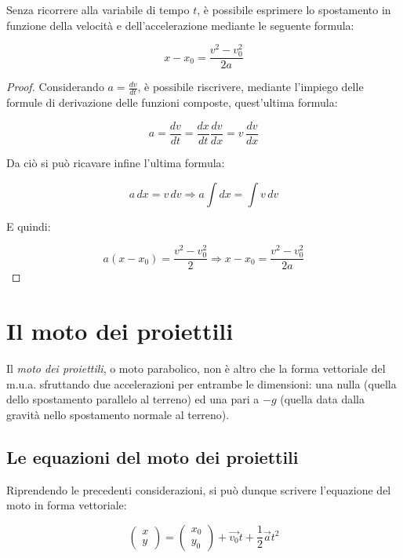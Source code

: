 Senza ricorrere alla variabile di tempo $t$, è possibile
esprimere lo spostamento in funzione della velocità e dell'accelerazione
mediante le seguente formula:

\begin{equation}
    x-x_0=\frac{v^2-v_0^2}{2a}
\end{equation}

\begin{proof}

    Considerando $a=\frac{dv}{dt}$, è possibile riscrivere, mediante l'impiego
    delle formule di derivazione delle funzioni composte, quest'ultima formula:

    \begin{equation*}
        a=\frac{dv}{dt}=\frac{dx}{dt}\frac{dv}{dx}=v\,\frac{dv}{dx}
    \end{equation*}

    Da ciò si può ricavare infine l'ultima formula:

    \begin{equation*}
        a\,dx=v\,dv \Rightarrow a \int dx = \int v \, dv
    \end{equation*}

    E quindi:

    \begin{equation*}
        a(x-x_0)=\frac{v^2-v_0^2}{2} \Rightarrow x-x_0=\frac{v^2-v_0^2}{2a}
    \end{equation*}

\end{proof}

\section{Il moto dei proiettili}

Il \textit{moto dei proiettili}, o moto parabolico, non
è altro che la forma vettoriale del m.u.a. sfruttando due accelerazioni per
entrambe le dimensioni: una nulla (quella dello spostamento parallelo al
terreno) ed una pari a $-g$ (quella data dalla gravità nello spostamento
normale al terreno).

\subsection{Le equazioni del moto dei proiettili}

Riprendendo le precedenti considerazioni, si può dunque scrivere
l'equazione del moto in forma vettoriale:

\begin{equation}
    \begin{pmatrix}
        x \\
        y
    \end{pmatrix} = \begin{pmatrix}
        x_0 \\
        y_0
    \end{pmatrix} + \vec{v_0} t + \frac12 \vec{a} t^2
\end{equation}

